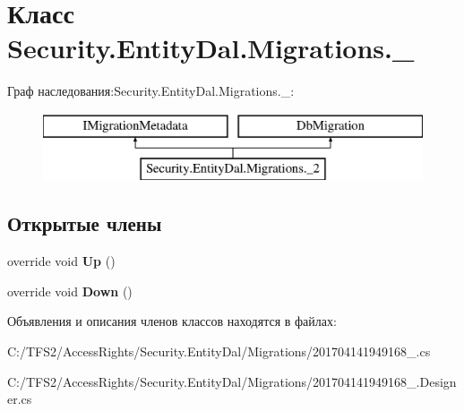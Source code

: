 \hypertarget{class_security_1_1_entity_dal_1_1_migrations_1_1__2}{}\section{Класс Security.\+Entity\+Dal.\+Migrations.\+\_}
\label{class_security_1_1_entity_dal_1_1_migrations_1_1__2}
Граф наследования\+:Security.\+Entity\+Dal.\+Migrations.\+\_\+:\begin{figure}[H]
\begin{center}
\leavevmode
\includegraphics[height=2.000000cm]{de/d6f/class_security_1_1_entity_dal_1_1_migrations_1_1__2}
\end{center}
\end{figure}
\subsection*{Открытые члены}
\begin{DoxyCompactItemize}
\item 
\mbox{\label{class_security_1_1_entity_dal_1_1_migrations_1_1__2_a8e2ff8f9f6c7a7993051d2f90e4a3f4c}} 
override void {\bfseries Up} ()
\item 
\mbox{\label{class_security_1_1_entity_dal_1_1_migrations_1_1__2_a349617fccf22393a65cb9aefa05feb73}} 
override void {\bfseries Down} ()
\end{DoxyCompactItemize}


Объявления и описания членов классов находятся в файлах\+:\begin{DoxyCompactItemize}
\item 
C\+:/\+T\+F\+S2/\+Access\+Rights/\+Security.\+Entity\+Dal/\+Migrations/201704141949168\+\_.\+cs\item 
C\+:/\+T\+F\+S2/\+Access\+Rights/\+Security.\+Entity\+Dal/\+Migrations/201704141949168\+\_.\+Designer.\+cs\end{DoxyCompactItemize}
